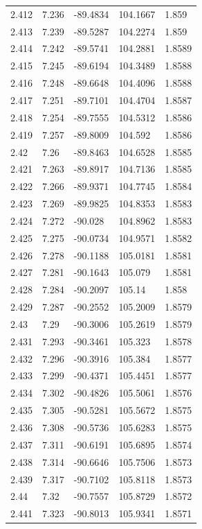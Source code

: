 \begin{tabular}{lllll}
2.412 & 7.236 & -89.4834 & 104.1667 & 1.859 \\
2.413 & 7.239 & -89.5287 & 104.2274 & 1.859 \\
2.414 & 7.242 & -89.5741 & 104.2881 & 1.8589 \\
2.415 & 7.245 & -89.6194 & 104.3489 & 1.8588 \\
2.416 & 7.248 & -89.6648 & 104.4096 & 1.8588 \\
2.417 & 7.251 & -89.7101 & 104.4704 & 1.8587 \\
2.418 & 7.254 & -89.7555 & 104.5312 & 1.8586 \\
2.419 & 7.257 & -89.8009 & 104.592 & 1.8586 \\
2.42 & 7.26 & -89.8463 & 104.6528 & 1.8585 \\
2.421 & 7.263 & -89.8917 & 104.7136 & 1.8585 \\
2.422 & 7.266 & -89.9371 & 104.7745 & 1.8584 \\
2.423 & 7.269 & -89.9825 & 104.8353 & 1.8583 \\
2.424 & 7.272 & -90.028 & 104.8962 & 1.8583 \\
2.425 & 7.275 & -90.0734 & 104.9571 & 1.8582 \\
2.426 & 7.278 & -90.1188 & 105.0181 & 1.8581 \\
2.427 & 7.281 & -90.1643 & 105.079 & 1.8581 \\
2.428 & 7.284 & -90.2097 & 105.14 & 1.858 \\
2.429 & 7.287 & -90.2552 & 105.2009 & 1.8579 \\
2.43 & 7.29 & -90.3006 & 105.2619 & 1.8579 \\
2.431 & 7.293 & -90.3461 & 105.323 & 1.8578 \\
2.432 & 7.296 & -90.3916 & 105.384 & 1.8577 \\
2.433 & 7.299 & -90.4371 & 105.4451 & 1.8577 \\
2.434 & 7.302 & -90.4826 & 105.5061 & 1.8576 \\
2.435 & 7.305 & -90.5281 & 105.5672 & 1.8575 \\
2.436 & 7.308 & -90.5736 & 105.6283 & 1.8575 \\
2.437 & 7.311 & -90.6191 & 105.6895 & 1.8574 \\
2.438 & 7.314 & -90.6646 & 105.7506 & 1.8573 \\
2.439 & 7.317 & -90.7102 & 105.8118 & 1.8573 \\
2.44 & 7.32 & -90.7557 & 105.8729 & 1.8572 \\
2.441 & 7.323 & -90.8013 & 105.9341 & 1.8571 \\

\end{tabular}
